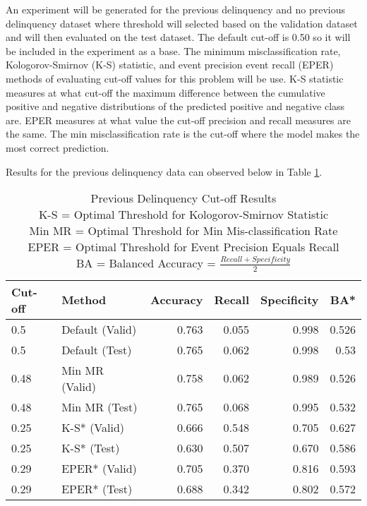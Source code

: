 An experiment will be generated for the previous delinquency and no previous delinquency dataset where threshold will selected based on the validation dataset and will then evaluated on the test dataset. The default cut-off is 0.50 so it will be included in the experiment as a base. The minimum misclassification rate, Kologorov-Smirnov (K-S) statistic, and event precision event recall (EPER) methods of evaluating cut-off values for this problem will be use.
K-S statistic measures at what cut-off the maximum difference between the cumulative positive and negative distributions of the predicted positive and negative class are. EPER measures at what value the cut-off precision and recall measures are the same. The min misclassification rate is the cut-off where the model makes the most correct prediction. 

Results for the previous delinquency data can observed below in Table \ref{table:DelinquencyModelCutoff}. 	

\begin{table}[H]
	\centering
\small
		\begin{tabular}{|l|l|r|r|r|r|}
			\hline
			\textbf{Cut-off} & \textbf{Method}       & \textbf{Accuracy} & \textbf{Recall} & \textbf{Specificity}  & \textbf{BA*} \\ \hline
			0.5              & Default (Valid)       & 0.763             & 0.055           & 0.998                  & 0.526    \\
			0.5              & Default (Test)        & 0.765             & 0.062           & 0.998                    & 0.53  \\ \hline
			0.48             & Min MR (Valid)        & 0.758             & 0.062           & 0.989                       & 0.526 \\
			0.48             & Min MR (Test)         & \cellcolor{yellow!25}0.765         & 0.068                & \cellcolor{yellow!25}0.995    & 0.532   \\ \hline
			0.25             & K-S* (Valid) 		     & 0.666             & 0.548           & 0.705                    & 0.627  \\
			0.25             & K-S* (Test)  		     & 0.630             & \cellcolor{yellow!25}0.507                          & 0.670  & \cellcolor{yellow!25}0.586     \\ \hline
			0.29             & EPER* (Valid)          & 0.705             & 0.370           & 0.816                    & 0.593   \\
			0.29             & EPER* (Test)           & 0.688             & 0.342           & 0.802                 & 0.572    \\ \hline
		\end{tabular}
	\caption{Previous Delinquency Cut-off Results 
			\\ K-S = Optimal Threshold for Kologorov-Smirnov Statistic
			\\ Min MR = Optimal Threshold for Min Mis-classification Rate
			\\ EPER = Optimal Threshold for Event Precision Equals Recall
			\\ BA = Balanced Accuracy = $\frac{Recall + Specificity }{2}$
		}
	\label{table:DelinquencyModelCutoff}
\end{table}

